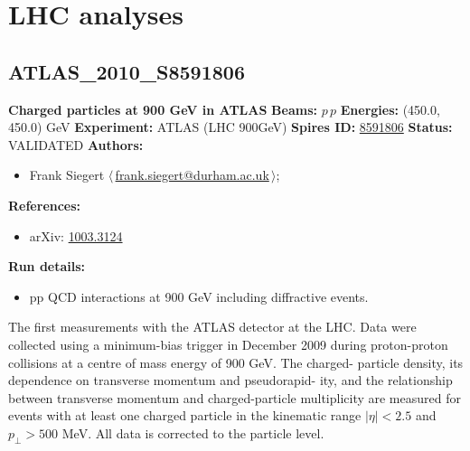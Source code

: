 \section{LHC analyses}\subsection[ATLAS\_2010\_S8591806]{ATLAS\_2010\_S8591806\,\cite{Aad:2010rd}}
\textbf{Charged particles at 900 GeV in ATLAS}\newline
\textbf{Beams:} $p$\,$p$ \newline
\textbf{Energies:} (450.0, 450.0) GeV \newline
\textbf{Experiment:} ATLAS (LHC 900GeV) \newline
\textbf{Spires ID:} \href{http://www.slac.stanford.edu/spires/find/hep/www?rawcmd=key+8591806}{8591806}\newline
\textbf{Status:} VALIDATED\newline
\textbf{Authors:}
\begin{itemize}
  \item Frank Siegert $\langle\,$\href{mailto:frank.siegert@durham.ac.uk}{frank.siegert@durham.ac.uk}$\,\rangle$;
\end{itemize}
\textbf{References:}
\begin{itemize}
  \item arXiv: \href{http://arxiv.org/abs/1003.3124}{1003.3124}
\end{itemize}
\textbf{Run details:}
\begin{itemize}

  \item pp QCD interactions at 900 GeV including diffractive events.\end{itemize}

\noindent The ﬁrst measurements with the ATLAS detector at the LHC. Data were collected using a minimum-bias trigger in December 2009 during proton-proton collisions at a centre of mass energy of 900 GeV. The charged- particle density, its dependence on transverse momentum and pseudorapid- ity, and the relationship between transverse momentum and charged-particle multiplicity are measured for events with at least one charged particle in the kinematic range $|\eta| < 2.5$ and $p_\perp > 500$ MeV. All data is corrected to the particle level.

\clearpage


